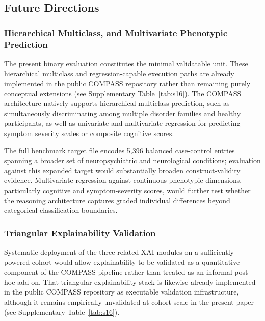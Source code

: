 \documentclass[11pt,a4paper,twoside]{article}
\begin{document}
\subsection{Future Directions}

\subsubsection{Hierarchical Multiclass, and Multivariate Phenotypic Prediction}

The present binary evaluation constitutes the minimal validatable unit. These hierarchical multiclass and regression-capable execution paths are already implemented in the public COMPASS repository rather than remaining purely conceptual extensions (see Supplementary Table~\ref{tab:s16}). The COMPASS architecture natively supports hierarchical multiclass prediction, such as simultaneously discriminating among multiple disorder families and healthy participants, as well as univariate and multivariate regression for predicting symptom severity scales or composite cognitive scores.

The full benchmark target file encodes 5,396 balanced case-control entries spanning a broader set of neuropsychiatric and neurological conditions; evaluation against this expanded target would substantially broaden construct-validity evidence. Multivariate regression against continuous phenotypic dimensions, particularly cognitive and symptom-severity scores, would further test whether the reasoning architecture captures graded individual differences beyond categorical classification boundaries.

\subsubsection{Triangular Explainability Validation}

Systematic deployment of the three related XAI modules on a sufficiently powered cohort would allow explainability to be validated as a quantitative component of the COMPASS pipeline rather than treated as an informal post-hoc add-on. That triangular explainability stack is likewise already implemented in the public COMPASS repository as executable validation infrastructure, although it remains empirically unvalidated at cohort scale in the present paper (see Supplementary Table~\ref{tab:s16}).
\end{document}
